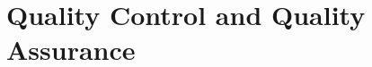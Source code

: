 \ifdefined\isfinal\documentclass[final]{pd-tdr}\else\documentclass{pd-tdr}\fi
\begin{document}
\chapter{Quality Control and Quality Assurance}







%


% 

\cleardoublepage


\end{document}
